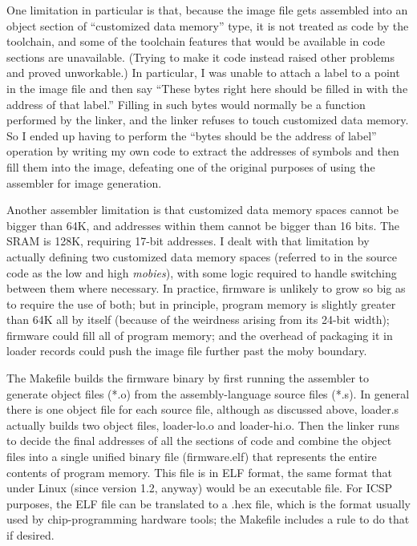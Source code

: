 One limitation in particular is that, because the image file gets assembled
into an object section of ``customized data memory'' type, it is not treated
as code by the toolchain, and some of the toolchain features that would be
available in code sections are unavailable.  (Trying to make it code instead
raised other problems and proved unworkable.) In particular, I was unable to
attach a label to a point in the image file and then say ``These bytes right
here should be filled in with the address of that label.'' Filling in such
bytes would normally be a function performed by the linker, and the linker
refuses to touch customized data memory.  So I ended up having to perform
the ``bytes should be the address of label'' operation by writing my own
code to extract the addresses of symbols and then fill them into the image,
defeating one of the original purposes of using the assembler for image
generation.

Another assembler limitation is that customized data memory spaces cannot be
bigger than 64K, and addresses within them cannot be bigger than 16 bits. 
The SRAM is 128K, requiring 17-bit addresses.  I dealt with that limitation
by actually defining two customized data memory spaces (referred to in the
source code as the low and high \emph{mobies}), with some logic required to
handle switching between them where necessary.  In practice, firmware is
unlikely to grow so big as to require the use of both; but in principle,
program memory is slightly greater than 64K all by itself (because of the
weirdness arising from its 24-bit width); firmware could fill all of program
memory; and the overhead of packaging it in loader records could push the
image file further past the moby boundary.

The Makefile builds the firmware binary by first running the assembler to
generate object files (*.o) from the assembly-language source files (*.s). 
In general there is one object file for each source file, although as
discussed above, loader.s actually builds two object files, loader-lo.o and
loader-hi.o.  Then the linker runs to decide the final addresses of all the
sections of code and combine the object files into a single unified binary
file (firmware.elf) that represents the entire contents of program memory. 
This file is in ELF format, the same format that under Linux (since version
1.2, anyway) would be an executable file.  For ICSP purposes, the ELF file
can be translated to a .hex file, which is the format usually used by
chip-programming hardware tools; the Makefile includes a rule to do that if
desired.

